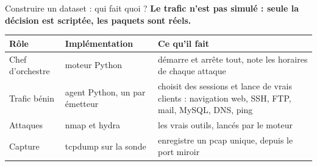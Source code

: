 \documentclass[aspectratio=169,11pt,xcolor=table]{beamer}
\begin{document}
\begin{frame}{Construire un dataset : qui fait quoi ?}
  \textbf{Le trafic n'est pas simulé : seule la décision est scriptée, les paquets sont réels.}
  \vspace{.8em}

  \small
  \renewcommand{\arraystretch}{1.25}
  \begin{tabularx}{\linewidth}{@{}p{.22\linewidth}p{.26\linewidth}X@{}}
    \toprule
    \textbf{Rôle} & \textbf{Implémentation} & \textbf{Ce qu'il fait} \\
    \midrule
    Chef d'orchestre & moteur Python & démarre et arrête tout, note les horaires de chaque attaque \\
    Trafic bénin & agent Python, un par émetteur & choisit des sessions et lance de vrais clients : navigation web, SSH, FTP, mail, MySQL, DNS, ping \\
    Attaques & nmap et hydra & les vrais outils, lancés par le moteur \\
    Capture & tcpdump sur la sonde & enregistre un pcap unique, depuis le port miroir \\
    \bottomrule
  \end{tabularx}
\end{frame}
\end{document}
